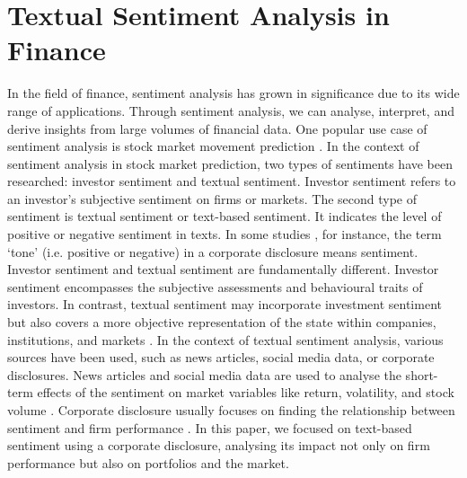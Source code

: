 \documentclass[logo,bsc,singlespacing,parskip]{infthesis}
\begin{document}
\section{Textual Sentiment Analysis in Finance}
In the field of finance, sentiment analysis has grown in significance due to its wide range of applications. Through sentiment analysis, we can analyse, interpret, and derive insights from large volumes of financial data. One popular use case of sentiment analysis is stock market movement prediction \cite{Schumaker2009, Shah2018, Maqbool2023, GloddHristova2023, Wang2023, Smailovic2013, Ren2019}. In the context of sentiment analysis in stock market prediction, two types of sentiments have been researched: investor sentiment and textual sentiment. Investor sentiment refers to an investor’s subjective sentiment on firms or markets. The second type of sentiment is textual sentiment or text-based sentiment. It indicates the level of positive or negative sentiment in texts. In some studies \cite{ke2020predicting, Jegadeesh2013}, for instance, the term ‘tone’ (i.e. positive or negative) in a corporate disclosure means sentiment. Investor sentiment and textual sentiment are fundamentally different. Investor sentiment encompasses the subjective assessments and behavioural traits of investors. In contrast, textual sentiment may incorporate investment sentiment but also covers a more objective representation of the state within companies, institutions, and markets \cite{Kearney2014}. In the context of textual sentiment analysis, various sources have been used, such as news articles, social media data, or corporate disclosures. News articles and social media data are used to analyse the short-term effects of the sentiment on market variables like return, volatility, and stock volume \cite{Shah2018, Wang2023}. Corporate disclosure usually focuses on finding the relationship between sentiment and firm performance \cite{Zhou2020, Che2020}. In this paper, we focused on text-based sentiment using a corporate disclosure, analysing its impact not only on firm performance but also on portfolios and the market. 
\end{document}
